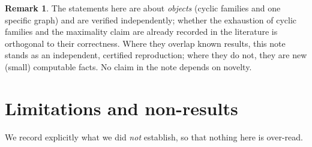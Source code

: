 \documentclass[11pt]{article}
\theoremstyle{definition}
\newtheorem{remark}[theorem]{Remark}
\theoremstyle{plain}
\begin{document}
\begin{remark}
The statements here are about \emph{objects} (cyclic families and one specific
graph) and are verified independently; whether the exhaustion of cyclic
families and the maximality claim are already recorded in the literature is
orthogonal to their correctness. Where they overlap known results, this note
stands as an independent, certified reproduction; where they do not, they are
new (small) computable facts. No claim in the note depends on novelty.
\end{remark}

\section{Limitations and non-results}\label{sec:limits}

We record explicitly what we did \emph{not} establish, so that nothing here is
over-read.
\end{document}
